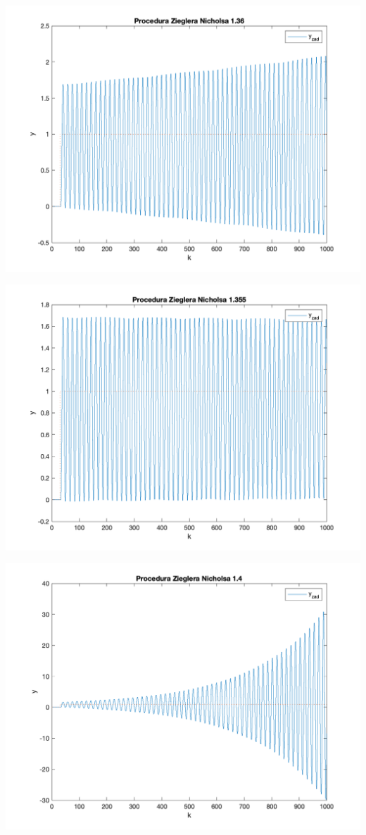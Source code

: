 \documentclass[a4paper, 11pt]{article}
\begin{document}
\begin{enumerate}
 \includegraphics[width=\linewidth]{./ModelsP3/ZN/P2_K136png.png} 
 
 \includegraphics[width=\linewidth]{./ModelsP3/ZN/P2_K1355png.png} 
 
 \includegraphics[width=\linewidth]{./ModelsP3/ZN/P2_K14png.png} 
 

\end{enumerate}
\end{document}
